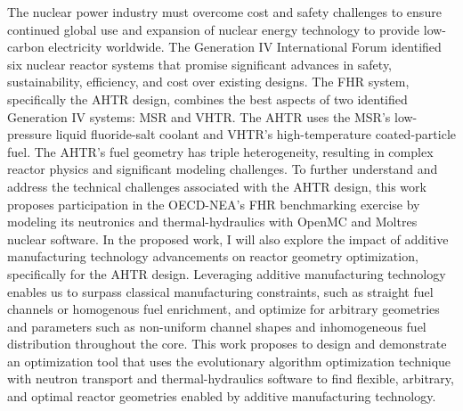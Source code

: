 \vspace{-1.5cm}
The nuclear power industry must overcome cost and safety challenges to ensure 
continued global use and expansion of nuclear energy technology to provide 
low-carbon electricity worldwide.
The Generation IV International Forum identified six nuclear reactor systems 
that promise significant advances in safety, sustainability, efficiency, 
and cost over existing designs.
The \acrfull{FHR} system, specifically the \acrfull{AHTR} design, combines the 
best aspects of two identified Generation IV systems: \acrfull{MSR} and \acrfull{VHTR}. 
The \acrshort{AHTR} uses the \acrshort{MSR}'s low-pressure liquid fluoride-salt 
coolant and \acrshort{VHTR}'s high-temperature coated-particle fuel. 
The \acrshort{AHTR}'s fuel geometry has triple heterogeneity, resulting in complex 
reactor physics and significant modeling challenges. 
To further understand and address the technical challenges associated with the 
\acrshort{AHTR} design, this work proposes participation in the \acrlong{OECD}-\acrlong{NEA}'s 
\acrshort{FHR} benchmarking exercise by modeling its neutronics and thermal-hydraulics 
with OpenMC and Moltres nuclear software. 
In the proposed work, I will also explore the impact of additive manufacturing
technology advancements on reactor geometry optimization, specifically for the 
\acrshort{AHTR} design.
Leveraging additive manufacturing technology enables us to surpass classical manufacturing
constraints, such as straight fuel channels or homogenous fuel enrichment, and optimize for
arbitrary geometries and parameters such as non-uniform channel shapes and 
inhomogeneous fuel distribution throughout the core.
This work proposes to design and demonstrate an optimization tool that uses the 
evolutionary algorithm optimization technique with neutron transport and 
thermal-hydraulics software to find flexible, arbitrary, and optimal reactor 
geometries enabled by additive manufacturing technology. 